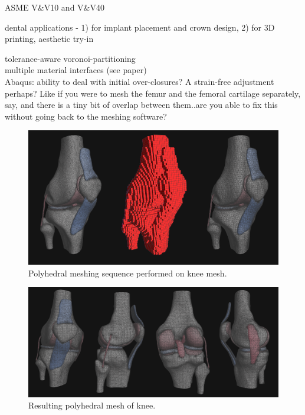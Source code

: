 ASME V\&V10 and V\&V40

dental applications - 1) for implant placement and crown design, 2) for 3D printing, aesthetic try-in 

tolerance-aware voronoi-partitioning \\
multiple material interfaces (see paper) \\

Abaqus: ability to deal with initial over-closures? A strain-free adjustment perhaps? Like if you were to mesh the femur and the femoral cartilage separately, say, and there is a tiny bit of overlap between them..are you able to fix this without going back to the meshing software?  

\begin{figure}[tbh]
\centering
\includegraphics{media/sequence.png}
\caption[sequence]{Polyhedral meshing sequence performed on knee mesh.}
\label{fig.sequence}
\end{figure}

\begin{figure}
\centering
\includegraphics[scale=0.82]{media/fullmesh.png}
\caption[polyhedral knee]{Resulting polyhedral mesh of knee.}
\label{fig.sample_1}
\end{figure}

